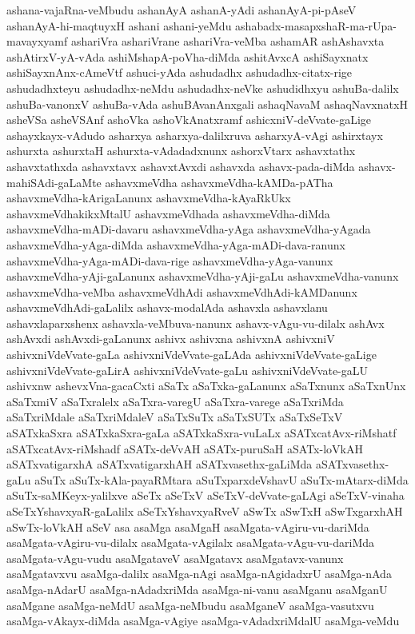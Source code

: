{ashana-vajaRna-veMbudu
ashanAyA
ashanA-yAdi
ashanAyA-pi-pAseV
ashanAyA-hi-maqtuyxH
ashani
ashani-yeMdu
ashabadx-masapxshaR-ma-rUpa-mavayxyamf
ashariVra
ashariVrane
ashariVra-veMba
ashamAR
ashAshavxta
ashAtirxV-yA-vAda
ashiMshapA-poVha-diMda
ashitAvxcA
ashiSayxnatx
ashiSayxnAnx-cAmeVtf
ashuci-yAda
ashudadhx
ashudadhx-citatx-rige
ashudadhxteyu
ashudadhx-neMdu
ashudadhx-neVke
ashudidhxyu
ashuBa-dalilx
ashuBa-vanonxV
ashuBa-vAda
ashuBAvanAnxgali
ashaqNavaM
ashaqNavxnatxH
asheVSa
asheVSAnf
ashoVka
ashoVkAnatxramf
ashicxniV-deVvate-gaLige
ashayxkayx-vAdudo
asharxya
asharxya-dalilxruva
asharxyA-vAgi
ashirxtayx
ashurxta
ashurxtaH
ashurxta-vAdadadxnunx
ashorxVtarx
ashavxtathx
ashavxtathxda
ashavxtavx
ashavxtAvxdi
ashavxda
ashavx-pada-diMda
ashavx-mahiSAdi-gaLaMte
ashavxmeVdha
ashavxmeVdha-kAMDa-pATha
ashavxmeVdha-kArigaLanunx
ashavxmeVdha-kAyaRkUkx
ashavxmeVdhakikxMtalU
ashavxmeVdhada
ashavxmeVdha-diMda
ashavxmeVdha-mADi-davaru
ashavxmeVdha-yAga
ashavxmeVdha-yAgada
ashavxmeVdha-yAga-diMda
ashavxmeVdha-yAga-mADi-dava-ranunx
ashavxmeVdha-yAga-mADi-dava-rige
ashavxmeVdha-yAga-vanunx
ashavxmeVdha-yAji-gaLanunx
ashavxmeVdha-yAji-gaLu
ashavxmeVdha-vanunx
ashavxmeVdha-veMba
ashavxmeVdhAdi
ashavxmeVdhAdi-kAMDanunx
ashavxmeVdhAdi-gaLalilx
ashavx-modalAda
ashavxla
ashavxlanu
ashavxlaparxshenx
ashavxla-veMbuva-nanunx
ashavx-vAgu-vu-dilalx
ashAvx
ashAvxdi
ashAvxdi-gaLanunx
ashivx
ashivxna
ashivxnA
ashivxniV
ashivxniVdeVvate-gaLa
ashivxniVdeVvate-gaLAda
ashivxniVdeVvate-gaLige
ashivxniVdeVvate-gaLirA
ashivxniVdeVvate-gaLu
ashivxniVdeVvate-gaLU
ashivxnw
ashevxVna-gacaCxti
aSaTx
aSaTxka-gaLanunx
aSaTxnunx
aSaTxnUnx
aSaTxmiV
aSaTxralelx
aSaTxra-varegU
aSaTxra-varege
aSaTxriMda
aSaTxriMdale
aSaTxriMdaleV
aSaTxSuTx
aSaTxSUTx
aSaTxSeTxV
aSATxkaSxra
aSATxkaSxra-gaLa
aSATxkaSxra-vuLaLx
aSATxcatAvx-riMshatf
aSATxcatAvx-riMshadf
aSATx-deVvAH
aSATx-puruSaH
aSATx-loVkAH
aSATxvatigarxhA
aSATxvatigarxhAH
aSATxvasethx-gaLiMda
aSATxvasethx-gaLu
aSuTx
aSuTx-kAla-payaRMtara
aSuTxparxdeVshavU
aSuTx-mAtarx-diMda
aSuTx-saMKeyx-yalilxve
aSeTx
aSeTxV
aSeTxV-deVvate-gaLAgi
aSeTxV-vinaha
aSeTxYshavxyaR-gaLalilx
aSeTxYshavxyaRveV
aSwTx
aSwTxH
aSwTxgarxhAH
aSwTx-loVkAH
aSeV
asa
asaMga
asaMgaH
asaMgata-vAgiru-vu-dariMda
asaMgata-vAgiru-vu-dilalx
asaMgata-vAgilalx
asaMgata-vAgu-vu-dariMda
asaMgata-vAgu-vudu
asaMgataveV
asaMgatavx
asaMgatavx-vanunx
asaMgatavxvu
asaMga-dalilx
asaMga-nAgi
asaMga-nAgidadxrU
asaMga-nAda
asaMga-nAdarU
asaMga-nAdadxriMda
asaMga-ni-vanu
asaMganu
asaMganU
asaMgane
asaMga-neMdU
asaMga-neMbudu
asaMganeV
asaMga-vasutxvu
asaMga-vAkayx-diMda
asaMga-vAgiye
asaMga-vAdadxriMdalU
asaMga-veMdu
}
